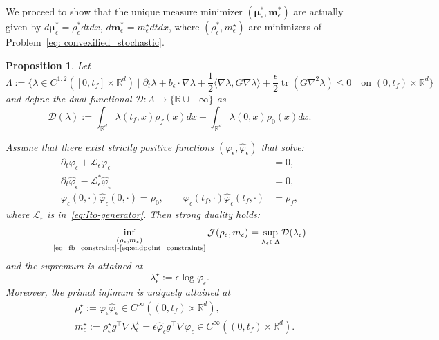 \documentclass{amsart}
\newtheorem{proposition}[theorem]{Proposition}
\numberwithin{equation}{section}
\newcommand{\R}{\mathbb{R}}
\newcommand{\map}[3]{#1:#2 \rightarrow #3}
\begin{document}
We proceed to show that the unique measure minimizer $(\boldsymbol{\mu}_\epsilon^*, \mathbf{m}_\epsilon^*)$ are actually given by $d\boldsymbol{\mu}_\epsilon^* = \rho_\epsilon^* dt dx$, $d\mathbf{m}_\epsilon^* = m_{\epsilon}^\star dt dx$, where $(\rho_\epsilon^*,m_{\epsilon}^\star)$ are minimizers of Problem~\eqref{eq: convexified_stochastic}.
\begin{proposition}\label{prop: Strong duality and attainment}
Let 
\begin{equation}\label{eq: dual_set_thm}
 \Lambda := \Bigg\{ \lambda \in C^{1,2}([0,t_f]\times\mathbb{R}^d) \;\Bigg|\; \partial_t\lambda + b_\epsilon\cdot\nabla\lambda + \frac12\langle \nabla\lambda, G\nabla\lambda\rangle + \frac{\epsilon}{2}\operatorname{tr}(G\nabla^2\lambda) \le 0 \quad \text{on } (0,t_f)\times\mathbb{R}^d \Bigg\}   
\end{equation}
and define the dual functional $\map{\mathcal D}{\Lambda}{\{\R\cup-\infty\}}$ as
\begin{equation}\label{eq:dual-func-thm}
\mathcal D(\lambda):=\int_{\R^d}\lambda(t_f,x)\rho_f(x) dx
-\int_{\R^d}\lambda(0,x)\rho_0(x) dx.
\end{equation}

Assume that there exist strictly positive functions $(\varphi_\epsilon,\hat\varphi_\epsilon)$ that solve: %
\begin{subequations}\label{eq:Schr-system-thm}
\begin{align}
\partial_t\varphi_\epsilon + \mathcal L_\epsilon \varphi_\epsilon &=0,\label{eq:Schr-fwd}\\
\partial_t\hat\varphi_\epsilon - \mathcal L_\epsilon^* \hat\varphi_\epsilon &=0,\label{eq:Schr-bwd}\\
\varphi_\epsilon(0,\cdot)\hat\varphi_\epsilon(0,\cdot)=\rho_0,\qquad
\varphi_\epsilon(t_f,\cdot)\hat\varphi_\epsilon(t_f,\cdot)&=\rho_f,\label{eq:Schr-bc}
\end{align}
\end{subequations}
where $\mathcal L_\epsilon$ is in~\eqref{eq:Ito-generator}. Then strong duality holds: 
\[ 
\inf_{\substack{(\rho_{\epsilon}, m_{\epsilon}) \\ \text{\eqref{eq: fb_constraint}-\eqref{eq:endpoint_constraints}}}} 
\mathcal{J}(\rho_{\epsilon}, m_{\epsilon}) = \sup_{\lambda_{\epsilon}\in\Lambda}\mathcal D(\lambda_{\epsilon})
\]
and the supremum is attained at
\begin{equation}\label{eq:optimal-dual}
\lambda_\epsilon^\star:=\epsilon\log\varphi_\epsilon.
\end{equation}
Moreover, the primal infimum is uniquely attained at
\begin{align}\label{eq:optimal-primal}
&\rho_\epsilon^\star:=\varphi_\epsilon\hat\varphi_\epsilon\in C^\infty((0,t_f)\times\R^d),\nonumber\\\
&m_\epsilon^\star:=\rho_\epsilon^\star g^\top\nabla\lambda_\epsilon^\star = \epsilon \hat\varphi_\epsilon g^\top\nabla\varphi_\epsilon\in C^\infty((0,t_f)\times\R^d).
\end{align}    
\end{proposition}
\end{document}
